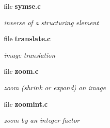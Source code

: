 \begin{CompactItemize}
\item 
file {\bf symse.c}
\begin{CompactList}\small\item\em inverse of a structuring element \item\end{CompactList}

\item 
file {\bf translate.c}
\begin{CompactList}\small\item\em image translation \item\end{CompactList}

\item 
file {\bf zoom.c}
\begin{CompactList}\small\item\em zoom (shrink or expand) an image \item\end{CompactList}

\item 
file {\bf zoomint.c}
\begin{CompactList}\small\item\em zoom by an integer factor \item\end{CompactList}

\end{CompactItemize}
